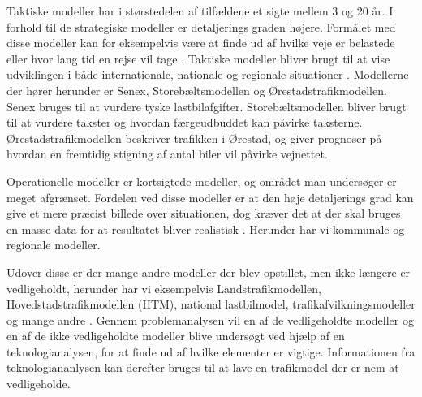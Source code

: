 \vspace{5mm}

Taktiske modeller har i størstedelen af tilfældene et sigte mellem 3 og 20 år. I forhold til de strategiske modeller er detaljerings graden højere. Formålet med disse modeller kan for eksempelvis være at finde ud af hvilke veje er belastede eller hvor lang tid en rejse vil tage \cite[s1]{dtfnotat}. Taktiske modeller bliver brugt til at vise udviklingen i både internationale, nationale og regionale situationer \cite[s. 9]{dtfnotat}. Modellerne der hører herunder er Senex, Storebæltsmodellen og Ørestadstrafikmodellen. Senex bruges til at vurdere tyske lastbilafgifter. Storebæltsmodellen bliver brugt til at vurdere takster og hvordan færgeudbuddet kan påvirke taksterne. Ørestadstrafikmodellen beskriver trafikken i Ørestad, og giver prognoser på hvordan en fremtidig stigning af antal biler vil påvirke vejnettet.

\vspace{5mm}

Operationelle modeller er kortsigtede modeller, og området man undersøger er meget afgrænset. Fordelen ved disse modeller er at den høje detaljerings grad kan give et mere præcist billede over situationen, dog kræver det at der skal bruges en masse data for at resultatet bliver realistisk \cite[s. 1]{dtfnotat}. Herunder har vi kommunale og regionale modeller.

\vspace{5mm}

Udover disse er der mange andre modeller der blev opstillet, men ikke længere er vedligeholdt, herunder har vi eksempelvis Landstrafikmodellen, Hovedstadstrafikmodellen (HTM), national lastbilmodel, trafikafvilkningsmodeller og mange andre \cite[s. 8]{dtfnotat}. Gennem problemanalysen vil en af de vedligeholdte modeller og en af de ikke vedligeholdte modeller blive undersøgt ved hjælp af en teknologianalysen, for at finde ud af hvilke elementer er vigtige. Informationen fra teknologiananlysen kan derefter bruges til at lave en trafikmodel der er nem at vedligeholde.